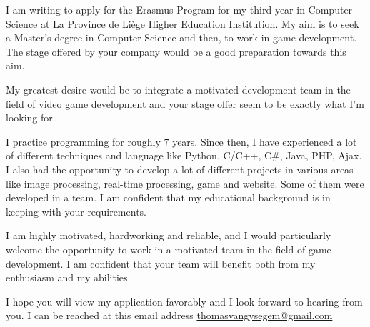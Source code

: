 \documentclass[10pt,stdletter,dateno]{newlfm}
\begin{document}
\begin{newlfm}

I am writing to apply for the Erasmus Program for my third year in Computer Science
at \og La Province de Li\`ege Higher Education Institution\fg. 
My aim is to seek a Master's degree in Computer Science and then, to work in game development.
The stage offered by your company would be a good preparation towards this aim.

My greatest desire would be to integrate a motivated
development team in the field of video game development
and your stage offer seem to be exactly what I'm looking for.

I practice programming for roughly 7 years. Since then,
I have experienced a lot of different techniques and language like
Python, C/C++, C\#, Java, PHP, Ajax. I also had the opportunity to develop a lot
of different projects in various areas like image processing, real-time processing,
game and website. Some of them were developed in a team. I am confident that my
educational background is in keeping with your requirements.

I am highly motivated, hardworking and reliable, and I would particularly
welcome the opportunity to work in a motivated team in the field of game development.
I am confident that your team will benefit both from my enthusiasm and my abilities.

I hope you will view my application favorably and I look forward to hearing from you.
I can be reached at this email address \href{mailto:thomasvangysegem@gmail.com}{thomasvangysegem@gmail.com}

\end{newlfm}
\end{document}
